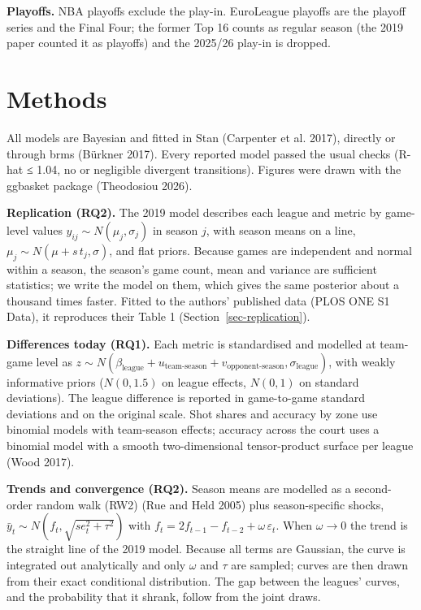 \documentclass[
  11pt,
  a4paper,
]{article}
\begin{document}
\textbf{Playoffs.} NBA playoffs exclude the play-in. EuroLeague playoffs
are the playoff series and the Final Four; the former Top 16 counts as
regular season (the 2019 paper counted it as playoffs) and the 2025/26
play-in is dropped.

\section{Methods}\label{methods}

All models are Bayesian and fitted in Stan (Carpenter et al. 2017),
directly or through brms (Bürkner 2017). Every reported model passed the
usual checks (R-hat ≤ 1.04, no or negligible divergent transitions).
Figures were drawn with the ggbasket package (Theodosiou 2026).

\textbf{Replication (RQ2).} The 2019 model describes each league and
metric by game-level values \(y_{ij} \sim N(\mu_j, \sigma_j)\) in season
\(j\), with season means on a line,
\(\mu_j \sim N(\mu + s\,t_j, \sigma)\), and flat priors. Because games
are independent and normal within a season, the season's game count,
mean and variance are sufficient statistics; we write the model on them,
which gives the same posterior about a thousand times faster. Fitted to
the authors' published data (PLOS ONE S1 Data), it reproduces their
Table 1 (Section~\ref{sec-replication}).

\textbf{Differences today (RQ1).} Each metric is standardised and
modelled at team-game level as
\(z \sim N(\beta_{\text{league}} + u_{\text{team-season}} + v_{\text{opponent-season}},
\sigma_{\text{league}})\), with weakly informative priors (\(N(0, 1.5)\)
on league effects, \(N(0, 1)\) on standard deviations). The league
difference is reported in game-to-game standard deviations and on the
original scale. Shot shares and accuracy by zone use binomial models
with team-season effects; accuracy across the court uses a binomial
model with a smooth two-dimensional tensor-product surface per league
(Wood 2017).

\textbf{Trends and convergence (RQ2).} Season means are modelled as a
second-order random walk (RW2) (Rue and Held 2005) plus season-specific
shocks, \(\bar y_t \sim N(f_t, \sqrt{se_t^2 + \tau^2})\) with
\(f_t = 2f_{t-1} - f_{t-2} + \omega\,\varepsilon_t\). When
\(\omega \to 0\) the trend is the straight line of the 2019 model.
Because all terms are Gaussian, the curve is integrated out analytically
and only \(\omega\) and \(\tau\) are sampled; curves are then drawn from
their exact conditional distribution. The gap between the leagues'
curves, and the probability that it shrank, follow from the joint draws.
\end{document}
